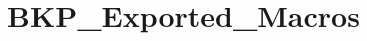 \hypertarget{group___b_k_p___exported___macros}{}\section{B\+K\+P\+\_\+\+Exported\+\_\+\+Macros}
\label{group___b_k_p___exported___macros}
